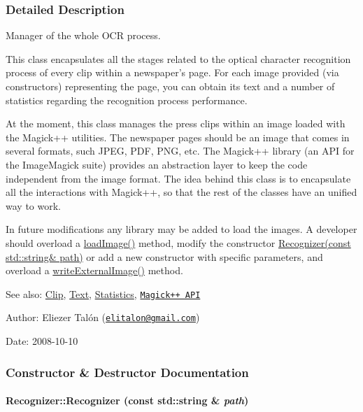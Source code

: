 \subsubsection{Detailed Description}
Manager of the whole OCR process. 

This class encapsulates all the stages related to the optical character recognition process of every clip within a newspaper's page. For each image provided (via constructors) representing the page, you can obtain its text and a number of statistics regarding the recognition process performance.

At the moment, this class manages the press clips within an image loaded with the Magick++ utilities. The newspaper pages should be an image that comes in several formats, such JPEG, PDF, PNG, etc. The Magick++ library (an API for the ImageMagick suite) provides an abstraction layer to keep the code independent from the image format. The idea behind this class is to encapsulate all the interactions with Magick++, so that the rest of the classes have an unified way to work.

In future modifications any library may be added to load the images. A developer should overload a \hyperlink{class_recognizer_acc4244738f2577a0c344c3b3af22eb0}{loadImage()} method, modify the constructor \hyperlink{class_recognizer_50ffc181208bb07ae651aba6249ee7e4}{Recognizer(const std::string\& path)} or add a new constructor with specific parameters, and overload a \hyperlink{class_recognizer_559f62a3e3e2d0b799bab38e975b4b67}{writeExternalImage()} method.

\begin{Desc}
\item[See also:]\hyperlink{class_clip}{Clip}, \hyperlink{class_text}{Text}, \hyperlink{class_statistics}{Statistics}, \href{http://www.imagemagick.org/Magick++/}{\tt Magick++ API}\end{Desc}
\begin{Desc}
\item[Author:]Eliezer Talón (\href{mailto:elitalon@gmail.com}{\tt elitalon@gmail.com}) \end{Desc}
\begin{Desc}
\item[Date:]2008-10-10 \end{Desc}


\subsubsection{Constructor \& Destructor Documentation}
\hypertarget{class_recognizer_50ffc181208bb07ae651aba6249ee7e4}{
\paragraph[{Recognizer}]{\setlength{\rightskip}{0pt plus 5cm}Recognizer::Recognizer (const std::string \& {\em path})}\hfill}
\label{class_recognizer_50ffc181208bb07ae651aba6249ee7e4}


